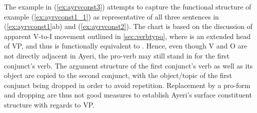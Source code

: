 The example in (\ref{ex:ayrvconst3}) attempts to capture the functional
structure of example (\ref{ex:ayrvconst1_1}) as representative of all three
sentences in (\ref{ex:ayrvconst1}ab) and (\ref{ex:ayrvconst2}). The chart is
based on the discussion of apparent V-to-I movement outlined in
\autoref{sec:verbtypo}, where  is an extended head of VP, and thus is
functionally equivalent to . Hence, even though V and O are not
directly adjacent in Ayeri, the pro-verb  may still stand
in for the first conjunct's verb. The argument structure of the first
conjunct's verb as well as its object are copied to the second conjunct, with
the object/topic of the first conjunct being dropped in order to avoid
repetition. Replacement by a pro-form and dropping are thus not good measures
to establish Ayeri's surface constituent structure with regards to VP.

